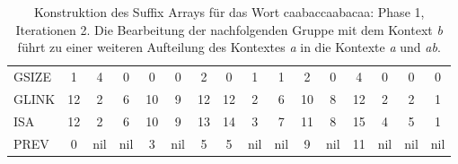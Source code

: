 \begin{table}[H]
\begin{adjustbox}{max width=\textwidth}
\begin{tabular}{lccccccccccccccc}
\multicolumn{1}{l|}{GSIZE}   & \multicolumn{1}{c|}{1}  & \cellcolor[HTML]{\red}4 & 0                         & 0                         & \multicolumn{1}{c|}{0}  & \cellcolor[HTML]{\red}2 & \multicolumn{1}{c|}{\cellcolor[HTML]{\red}0} & \multicolumn{1}{c|}{1}    & \multicolumn{1}{c|}{1}    & 2                          & \multicolumn{1}{c|}{0}     & 4  & 0                         & 0                         & 0   \\
\multicolumn{1}{l|}{GLINK}   & 12                      & 2                         & \cellcolor[HTML]{\red}6 & 10                        & 9                       & 12                        & 12                                             & 2                         & \cellcolor[HTML]{\red}6 & 10                         & 8                          & 12 & 2                         & 2                         & 1   \\
\multicolumn{1}{l|}{ISA}     & 12                      & 2                         & \cellcolor[HTML]{\red}6 & 10                        & 9                       & 13                        & 14                                             & \cellcolor[HTML]{\red}3 & \cellcolor[HTML]{\red}7 & 11                         & 8                          & 15 & \cellcolor[HTML]{\red}4 & \cellcolor[HTML]{\red}5 & 1   \\
\multicolumn{1}{l|}{PREV}    & 0                       & nil                       & nil                       & \cellcolor[HTML]{\red}3 & nil                     & 5                         & 5                                              & nil                       & nil                       & \cellcolor[HTML]{\red}9  & nil                        & 11 & nil                       & nil                       & nil
\end{tabular}
\end{adjustbox}

\caption[Konstruktion des Suffix Arrays f{\"u}r das Wort caabaccaabacaa: Phase 1, Iterationen 2]{Konstruktion des Suffix Arrays f{\"u}r das Wort caabaccaabacaa: Phase 1, Iterationen 2. Die Bearbeitung der nachfolgenden Gruppe mit dem Kontext \textit{b} f{\"u}hrt zu einer weiteren Aufteilung des Kontextes \textit{a} in die Kontexte \textit{a} und \textit{ab}.}
\label{table_complex_example_1_2} 
\end{table}

